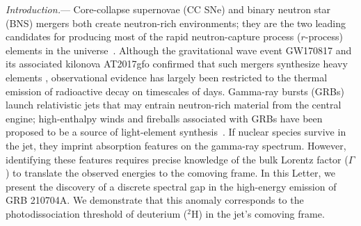 \documentclass[prd,twocolumn,amsmath,amssymb,aps,linenumbers]{revtex4-2} %
\begin{document}
\textit{Introduction.}---%
Core-collapse supernovae (CC SNe) and binary neutron star (BNS) mergers both create neutron-rich environments; they are the two leading candidates for producing most of the rapid neutron-capture process ($r$-process) elements in the universe~\citep[e.g.][]{1974ApJ...192L.145L, 1989Natur.340..126E,2007PhR...450...97A,2004A&A...416..997A,2014MNRAS.438.2177M,2015MNRAS.452.1970W, 2018ApJ...869..130R,2019LRR....23....1M,2020ApJ...903L...3W,2024Natur.626..737L}. Although the gravitational wave event GW170817 and its associated kilonova AT2017gfo confirmed that such mergers synthesize heavy elements \citep{2017PhRvL.119p1101A, 2019LRR....23....1M}, observational evidence has largely been restricted to the thermal emission of radioactive decay on timescales of days. 
Gamma-ray bursts (GRBs) launch relativistic jets that may entrain neutron-rich material from the central engine; high-enthalpy winds and fireballs associated with GRBs have been proposed to be a source of light-element synthesis~\citep[][]{1967ARA&A...5..525F,2001ApJ...561..957P,2000ApJ...533..424O,2001ApJ...562..887T,2002ApJ...580..368P,2003ApJ...588..931B}. If nuclear species survive in the jet, they imprint absorption features on the gamma-ray spectrum. However, identifying these features requires precise knowledge of the bulk Lorentz factor ($\Gamma$) to translate the observed energies to the comoving frame. In this Letter, we present the discovery of a discrete spectral gap in the high-energy emission of GRB 210704A. We demonstrate that this anomaly corresponds to the photodissociation threshold of deuterium ($^2$H) in the jet's comoving frame. %
\end{document}
